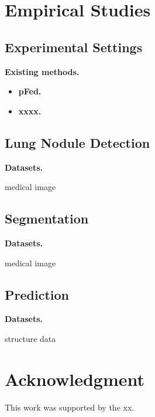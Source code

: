 \documentclass[journal]{IEEEtran}
\begin{document}
\section{Empirical Studies}

\subsection{Experimental Settings}

\textbf{Existing methods.}
\begin{itemize}
\item \textbf{pFed\cite{dd}.}
\item \textbf{xxxx.}
\end{itemize}








\subsection{Lung Nodule Detection}
\textbf{Datasets.}


medical image







\subsection{Segmentation}
\textbf{Datasets.}


medical image








\subsection{Prediction}
\textbf{Datasets.}

structure data







\section*{Acknowledgment}
This work was supported by the xx. 



  

\end{document}
